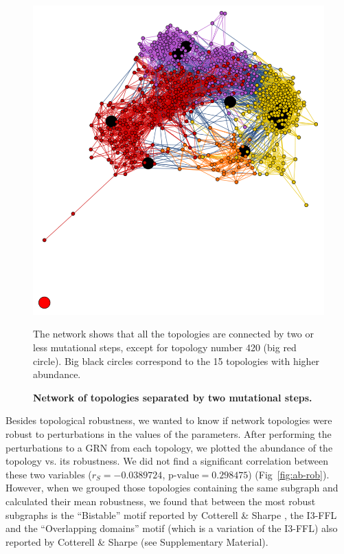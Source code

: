 \documentclass[10pt,letterpaper]{article}
\begin{document}
\begin{figure}
 \includegraphics[width=\textwidth]{figures/results/hamming-2pasos}
 \caption{\bf Network of topologies separated by two mutational steps.}
 The network shows that all the topologies are connected by two or less 
 mutational steps, except for topology number 420 (big red circle). Big black 
 circles correspond to the 15 topologies with higher abundance.
 \label{fig:2neut-net}
\end{figure}

Besides topological robustness, we wanted to know if network topologies were
robust to perturbations in the values of the parameters. After performing the
perturbations to a GRN from each topology, we plotted the abundance of the
topology vs. its robustness. We did not find a significant correlation between
these two variables ($r_S = −0.0389724$, $\text{p-value} = 0.298475$) 
(Fig~\ref{fig:ab-rob}). However, when we grouped those topologies containing 
the same subgraph and calculated their mean robustness, we found that between 
the most robust subgraphs is the ``Bistable'' motif reported by Cotterell \& 
Sharpe \cite{Cotterell2010}, the I3-FFL and the ``Overlapping domains'' motif 
(which is a variation of the I3-FFL) also reported by Cotterell \& Sharpe (see 
Supplementary Material).
\end{document}
